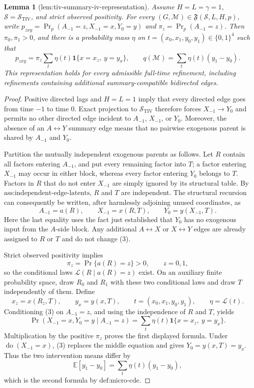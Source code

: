 \documentclass{article}
\newtheorem{lemma}{Lemma}
\begin{document}
\begin{lemma}[lem:tiv-summary-iv-representation]\label{lem:tiv-summary-iv-representation}
Assume \(H=L=\gamma=1\), \(\mathcal S=\mathcal S_{\mathrm{TIV}}\), and strict observed positivity.  For every \((G,\mathcal M)\in\mathfrak F(\mathcal S,L,H,p)\), write \(p_{zxy}=\Pr_p(A_{-1}=z,X_{-1}=x,Y_0=y)\) and \(\pi_z=\Pr_p(A_{-1}=z)\).  Then \(\pi_0,\pi_1>0\), and there is a probability mass \(\eta\) on \(t=(x_0,x_1,y_0,y_1)\in\{0,1\}^4\) such that
\[
p_{zxy}=\pi_z\sum_t\eta(t)\mathbf 1\{x=x_z,\ y=y_x\},
\qquad
q(\mathcal M)=\sum_t\eta(t)(y_1-y_0).
\]
This representation holds for every admissible full-time refinement, including refinements containing additional summary-compatible bidirected edges.
\end{lemma}
\begin{proof}
Positive directed lags and \(H=L=1\) imply that every directed edge goes from time \(-1\) to time \(0\).  Exact projection to \(\mathcal S_{\mathrm{TIV}}\) therefore forces \(X_{-1}\to Y_0\) and permits no other directed edge incident to \(A_{-1}\), \(X_{-1}\), or \(Y_0\).  Moreover, the absence of an \(A\leftrightarrow Y\) summary edge means that no pairwise exogenous parent is shared by \(A_{-1}\) and \(Y_0\).

Partition the mutually independent exogenous parents as follows.  Let \(R\) contain all factors entering \(A_{-1}\), and put every remaining factor into \(T\); a factor entering \(X_{-1}\) may occur in either block, whereas every factor entering \(Y_0\) belongs to \(T\).  Factors in \(R\) that do not enter \(X_{-1}\) are simply ignored by its structural table.  By \(\text{ass:independent-edge-latents}\), \(R\) and \(T\) are independent.  The structural recursion can consequently be written, after harmlessly adjoining unused coordinates, as
\[
A_{-1}=a(R),\qquad X_{-1}=x(R,T),\qquad Y_0=y(X_{-1},T).
\tag{3}
\]
Here the last equality uses the fact just established that \(Y_0\) has no exogenous input from the \(A\)-side block.  Any additional \(A\leftrightarrow X\) or \(X\leftrightarrow Y\) edges are already assigned to \(R\) or \(T\) and do not change (3).

Strict observed positivity implies
\[
\pi_z=\Pr\{a(R)=z\}>0,\qquad z=0,1,
\]
so the conditional laws \(\mathcal L(R\mid a(R)=z)\) exist.  On an auxiliary finite probability space, draw \(R_0\) and \(R_1\) with these two conditional laws and draw \(T\) independently of them.  Define
\[
x_z=x(R_z,T),\qquad y_x=y(x,T),\qquad
t=(x_0,x_1,y_0,y_1),\qquad \eta=\mathcal L(t).
\]
Conditioning (3) on \(A_{-1}=z\), and using the independence of \(R\) and \(T\), yields
\[
\Pr(X_{-1}=x,Y_0=y\mid A_{-1}=z)
=\sum_t\eta(t)\mathbf 1\{x=x_z,\ y=y_x\}.
\]
Multiplication by the positive \(\pi_z\) proves the first displayed formula.  Under \(\operatorname{do}(X_{-1}=x)\), (3) replaces the middle equation and gives \(Y_0=y(x,T)=y_x\).  Thus the two intervention means differ by
\[
\mathbb E[y_1-y_0]=\sum_t\eta(t)(y_1-y_0),
\]
which is the second formula by \(\text{def:micro-cde}\).
\end{proof}
\end{document}

